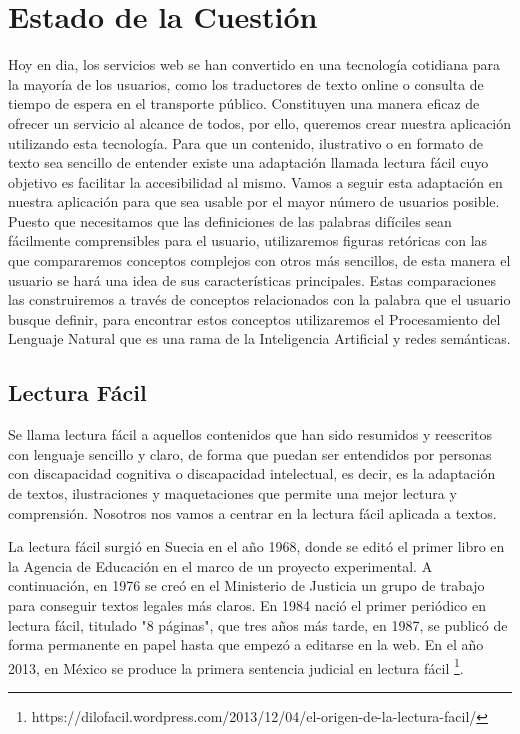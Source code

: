 \chapter{Estado de la Cuestión}
\label{cap:estadoDeLaCuestion}

Hoy en dia, los servicios web se han convertido en una tecnología cotidiana para la mayoría de los usuarios, como los traductores de texto online o consulta de tiempo de espera en el transporte público. Constituyen una manera eficaz de ofrecer un servicio al alcance de todos, por ello, queremos crear nuestra aplicación utilizando esta tecnología.\newline
Para que un contenido, ilustrativo o en formato de texto sea sencillo de entender existe una adaptación llamada lectura fácil cuyo objetivo es facilitar la accesibilidad al mismo. Vamos a seguir esta adaptación en nuestra aplicación para que sea usable por el mayor número de usuarios posible. Puesto que necesitamos que las definiciones de las palabras difíciles sean fácilmente comprensibles para el usuario, utilizaremos figuras retóricas con las que compararemos conceptos complejos con otros más sencillos, de esta manera el usuario se hará una idea de sus características principales. Estas comparaciones las construiremos a través de conceptos relacionados con la palabra que el usuario busque definir, para encontrar estos conceptos utilizaremos el Procesamiento del Lenguaje Natural que es una rama de la Inteligencia Artificial y redes semánticas.



\section{Lectura Fácil}
\label{cap:sec:lecturafacil}

Se llama lectura fácil a aquellos contenidos que han sido resumidos y reescritos con lenguaje sencillo y claro, de forma que puedan ser entendidos por personas con discapacidad cognitiva o discapacidad intelectual, es decir, es la adaptación de textos, ilustraciones y maquetaciones que permite una mejor lectura y comprensión.
Nosotros nos vamos a centrar en la lectura fácil aplicada a textos.

La lectura fácil surgió en Suecia en el año 1968, donde se editó el primer libro en la Agencia de Educación en el marco de un proyecto experimental. A continuación, en 1976 se creó en el Ministerio de Justicia un grupo de trabajo para conseguir textos legales más claros.
En 1984 nació el primer periódico en lectura fácil, titulado "8 páginas", que tres años más tarde, en 1987, se publicó de forma permanente en papel hasta que empezó a editarse en la web. 
En el año 2013, en México se produce la primera sentencia judicial en lectura fácil \footnote{https://dilofacil.wordpress.com/2013/12/04/el-origen-de-la-lectura-facil/}.

